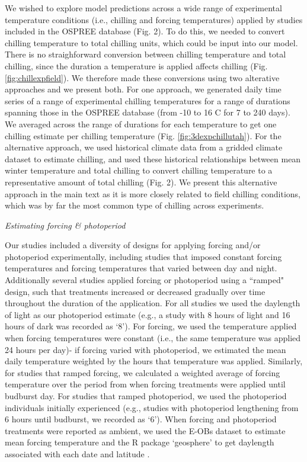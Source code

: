 \documentclass{article}
\begin{document}
\par We wished to explore model predictions across a wide range of experimental temperature conditions (i.e., chilling and forcing temperatures) applied by studies included in the OSPREE database (Fig. 2). To do this, we needed to convert chilling temperature to total chilling units, which could be input into our model. There is no straighforward conversion between chilling temperature and total chilling, since the duration a temperature is applied affects chilling (Fig. \ref{fig:chillexpfield}). We therefore made these conversions using two alterative approaches and we present both. For one approach, we generated daily time series of a range of experimental chilling temperatures for a range of durations spanning those in the OSPREE database (from -10 to 16 \degree C for 7 to 240 days). We averaged across the range of durations for each temperature to get one chilling estimate per chilling temperature (Fig. \ref{fig:3dexpchillutah}). For the alternative approach, we used historical climate data from a gridded climate dataset \citep[EOBs,][]{cornes2018} to estimate chilling, and used these historical relationships between mean winter temperature and total chilling to  convert chilling temperature to a representative amount of total chilling (Fig. 2). We present this alternative approach in the main text as it is more closely related to field chilling conditions, which was by far the most common type of chilling across experiments.

\par{\emph{Estimating forcing \& photoperiod}}

Our studies included a diversity of designs for applying forcing and/or photoperiod experimentally, including studies that imposed constant forcing temperatures and forcing temperatures that varied between day and night.  Additionally several studies applied forcing or photoperiod using a ``ramped" design, such that treatments increased or decreased gradually over time throughout the duration of the application. For all studies we used the daylength of light as our photoperiod estimate (e.g., a study with 8 hours of light and 16 hours of dark was recorded as `8'). For forcing, we used the temperature applied when forcing temperatures were constant (i.e., the same temperature was applied 24 hours per day)- if forcing varied with photoperiod, we estimated the mean daily temperature weighted by the hours that temperature was applied. Similarly, for studies that ramped forcing, we calculated a weighted average of forcing temperature over the period from when forcing treatments were applied until budburst day. For studies that ramped photoperiod, we used the photoperiod individuals initially experienced (e.g., studies with photoperiod lengthening from 6 hours until budburst, we recorded as `6'). When forcing and photoperiod treatments were reported as ambient, we used the E-OBs dataset to estimate mean forcing temperature and the R package `geosphere' to get daylength associated with each  date and latitude \citep{cornes2018}. 
\end{document}
